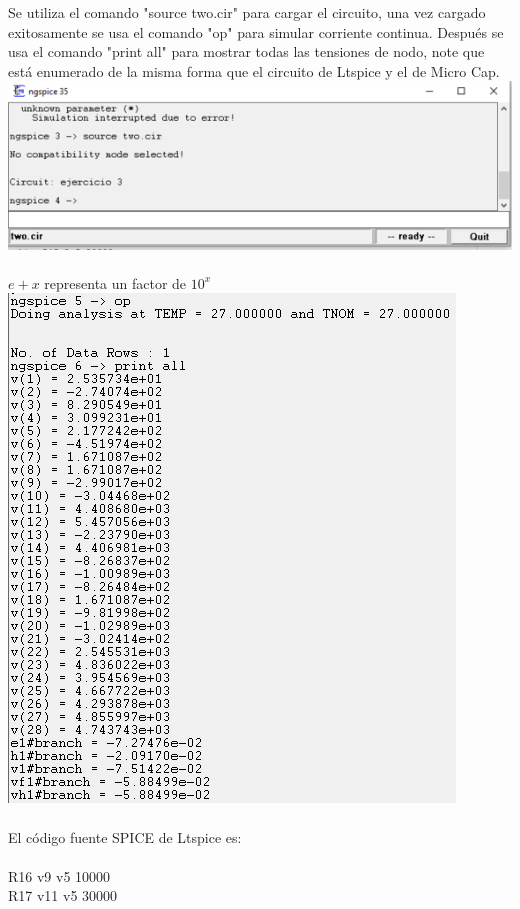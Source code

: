 \documentclass{article}
\begin{document}
Se utiliza el comando "source two.cir" para cargar el circuito, una vez cargado exitosamente se usa el comando "op" para simular corriente continua. Después se usa el comando "print all" para mostrar todas las tensiones de nodo, note que está enumerado de la misma forma que el circuito de Ltspice y el de Micro Cap.\\
\includegraphics[]{images/ngspice1_70.PNG}\\ \\
$e+x$ representa un factor de $10^x$ \\  
\includegraphics[]{images/ngspice2.PNG}\\ \\
El código fuente SPICE de Ltspice es:\\ \\ 
R16 v9 v5 10000\\
R17 v11 v5 30000\\
\end{document}
